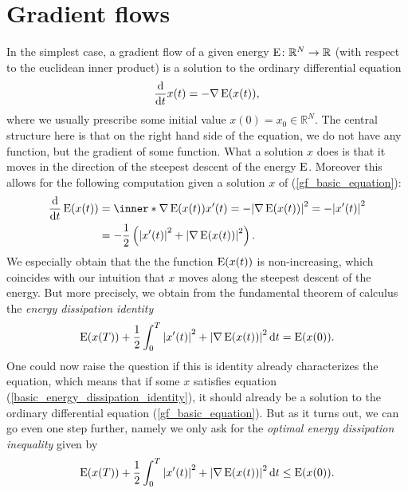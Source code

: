 \section{Gradient flows}

In the simplest case, a gradient flow of a given energy $ \operatorname{E} \colon \mathbb{ R }^{ N } \to \mathbb{ R } $ (with respect to the euclidean inner product) is a solution to the ordinary differential equation
\begin{equation}
	\label{gf_basic_equation}
	\dv{ t } x ( t ) = - \nabla \operatorname{E} ( x ( t ) ) ,
\end{equation}
where we usually prescribe some initial value $ x ( 0 ) = x_{ 0 } \in \mathbb{ R }^{ N } $. The central structure here is that on the right hand side of the equation, we do not have any function, but the gradient of some function. What a solution $ x $ does is that it moves in the direction of the steepest descent of the energy $ \operatorname{E} $. Moreover this allows for the following computation given a solution $ x $ of (\ref{gf_basic_equation}):
\begin{align*}
	\dv{ t } \energy ( x ( t ) ) 
	& =
	\inner*{ \nabla \energy ( x ( t ) ) }{ x ' ( t ) }
	=
	- \abs{ \nabla \energy ( x ( t ) ) }^{ 2 }
	=
	- \abs{ x' ( t ) }^{ 2 }
	\\
	& =
	- \frac{ 1 }{ 2 }
	\left(
		\abs{ x'( t ) }^{ 2 }
		+
		\abs{ \nabla \energy ( x ( t ) ) }^{ 2 }
	\right).
\end{align*}
We especially obtain that the the function $ \operatorname{E} ( x ( t ) ) $ is non-increasing, which coincides with our intuition that $ x $ moves along the steepest descent of the energy. But more precisely, we obtain from the fundamental theorem of calculus the \emph{energy dissipation identity}
\begin{equation}
	\label{basic_energy_dissipation_identity}
	\operatorname{E} ( x ( T ) )
	+
	\frac{ 1 }{ 2 }
	\int_{ 0 }^{ T }
		\abs{ x' ( t ) }^{ 2 }
		+
		\abs{ \nabla \operatorname{E} ( x ( t ) ) }^{ 2 }
	\dd{ t }
	= 
	\operatorname{E} ( x ( 0 ) ).
\end{equation}
One could now raise the question if this is identity already characterizes the equation, which means that if some $ x $ satisfies equation (\ref{basic_energy_dissipation_identity}), it should already be a solution to the ordinary differential equation (\ref{gf_basic_equation}). But as it turns out, we can go even one step further, namely we only ask for the \emph{optimal energy dissipation inequality} given by
\begin{equation}
	\label{basic_optimal_energy_dissipation_inequality}
	\operatorname{E} ( x ( T ) )
	+
	\frac{ 1 }{ 2 }
	\int_{ 0 }^{ T }
		\abs{ x' ( t ) }^{ 2 }
		+
		\abs{ \nabla \operatorname{E} ( x ( t ) ) }^{ 2 }
	\dd{ t }
	\leq
	\operatorname{E} ( x ( 0 ) ).
\end{equation}
